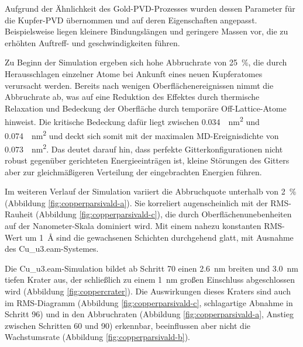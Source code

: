 Aufgrund der Ähnlichkeit des Gold-PVD-Prozesses wurden dessen Parameter für die Kupfer-PVD übernommen und auf deren Eigenschaften angepasst.
Beispielsweise liegen kleinere Bindungslängen und geringere Massen vor, die zu erhöhten Auftreff- und geschwindigkeiten führen.

Zu Beginn der Simulation ergeben sich hohe Abbruchrate von \SI{25}{\percent}, die durch Herausschlagen einzelner Atome bei Ankunft eines neuen Kupferatomes verursacht werden.
Bereits nach wenigen Oberflächenereignissen nimmt die Abbruchrate ab, was auf eine Reduktion des Effektes durch thermische Relaxation und Bedeckung der Oberfläche durch temporäre Off-Lattice-Atome hinweist.
Die kritische Bedeckung dafür liegt zwischen \SI{0.034}{\per\nano\meter\squared} und \SI{0.074}{\per\nano\meter\squared} und deckt sich somit mit der maximalen MD-Ereignisdichte von \SI{0.073}{\per\nano\meter\squared}.
Das deutet darauf hin, dass perfekte Gitterkonfigurationen nicht robust gegenüber gerichteten Energieeinträgen ist, kleine Störungen des Gitters aber zur gleichmäßigeren Verteilung der eingebrachten Energien führen.

Im weiteren Verlauf der Simulation variiert die Abbruchquote unterhalb von \SI{2}{\percent} (Abbildung \ref{fig:copperparsivald-a}).
Sie korreliert augenscheinlich mit der RMS-Rauheit (Abbildung \ref{fig:copperparsivald-c}), die durch Oberflächenunebenheiten auf der Nanometer-Skala dominiert wird.
Mit einem nahezu konstanten RMS-Wert um \SI{1}{\angstrom} sind die gewachsenen Schichten durchgehend glatt, mit Ausnahme des Cu\_u3.eam-Systemes.

Die Cu\_u3.eam-Simulation bildet ab Schritt 70 einen \SI{2.6}{\nano\meter} breiten und \SI{3.0}{\nano\meter} tiefen Krater aus, der schließlich zu einem \SI{1}{\nano\meter} großen Einschluss abgeschlossen wird (Abbildung \ref{fig:coppercrater}).
Die Auswirkungen dieses Kraters sind auch im RMS-Diagramm (Abbildung \ref{fig:copperparsivald-c}, schlagartige Abnahme in Schritt 96) und in den Abbruchraten (Abbildung \ref{fig:copperparsivald-a}, Anstieg zwischen Schritten 60 und 90) erkennbar, beeinflussen aber nicht die Wachstumsrate (Abbildung \ref{fig:copperparsivald-b}).

